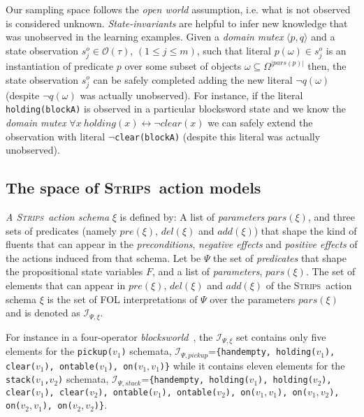 \documentclass{article}
\newcommand{\tup}[1]{{\langle #1 \rangle}}
\newcommand{\strips}{\textsc{Strips}}
\begin{document}
Our sampling space follows the {\em open world} assumption, i.e. what is not observed is considered unknown. {\em State-invariants} are helpful to infer new knowledge that was unobserved in the learning examples. Given a {\em domain mutex} $\tup{p,q}$ and a state observation $s_j^o\in \mathcal{O}(\tau)$, {\small $(1\leq j\leq m)$}, such that literal $p(\omega)\in s_j^o$ is an instantiation of predicate $p$ over some subset of objects $\omega\subseteq\Omega^{|pars(p)|}$ then, the state observation $s_j^o$ can be safely completed adding the new literal $\neg q(\omega)$ (despite $\neg q(\omega)$ was actually unobserved). For instance, if the literal {\tt\small holding(blockA)} is observed in a particular blocksword state and we know the {\em domain mutex} $\forall x\ holding(x)\leftrightarrow\neg clear(x)$ we can safely extend the observation with literal {\tt\small $\neg$clear(blockA)} (despite this literal was actually unobserved). 

\subsection{The space of \strips\ action models}
{\em A \strips\ action schema} $\xi$ is defined by: A list of {\em parameters} $pars(\xi)$, and three sets of predicates (namely $pre(\xi)$, $del(\xi)$ and $add(\xi)$) that shape the kind of fluents that can appear in the {\em preconditions}, {\em negative effects} and {\em positive effects} of the actions induced from that schema. Let be $\Psi$ the set of {\em predicates} that shape the propositional state variables $F$, and a list of {\em parameters}, $pars(\xi)$. The set of elements that can appear in $pre(\xi)$, $del(\xi)$ and $add(\xi)$ of the \strips\ action schema $\xi$ is the set of FOL interpretations of $\Psi$ over the parameters $pars(\xi)$ and is denoted as ${\mathcal I}_{\Psi,\xi}$.

For instance in a four-operator {\em blocksworld}~\cite{slaney2001blocks}, the ${\mathcal I}_{\Psi,\xi}$ set contains only five elements for the {\small \tt pickup($v_1$)} schemata, ${\mathcal I}_{\Psi,pickup}$={\small\tt\{handempty, holding($v_1$), clear($v_1$), ontable($v_1$), on($v_1,v_1$)\}} while it contains eleven elements for the {\small \tt stack($v_1$,$v_2$)} schemata, ${\mathcal I}_{\Psi,stack}$={\small\tt\{handempty, holding($v_1$), holding($v_2$), clear($v_1$), clear($v_2$), ontable($v_1$), ontable($v_2$), on($v_1,v_1$), on($v_1,v_2$), on($v_2,v_1$), on($v_2,v_2$)\}}. 
\end{document}
